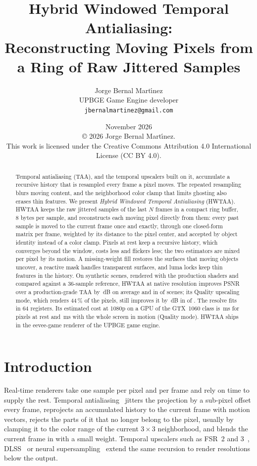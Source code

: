 \documentclass[11pt,a4paper]{article}
\title{Hybrid Windowed Temporal Antialiasing:\\Reconstructing Moving Pixels from a Ring of Raw Jittered Samples}
\author{Jorge Bernal Mart\'{\i}nez\\
  \small UPBGE Game Engine developer\\
  \small\texttt{jbernalmartinez@gmail.com}}
\date{November 2026\\[4pt]\footnotesize \copyright{} 2026 Jorge Bernal Mart\'{\i}nez. \\ This work is licensed under the Creative Commons Attribution 4.0 International License (CC BY 4.0).}
\begin{document}
\maketitle

\begin{abstract}
Temporal antialiasing (TAA), and the temporal upscalers built on it, accumulate a recursive history that is resampled every frame a pixel moves. The repeated resampling blurs moving content, and the neighborhood color clamp that limits ghosting also erases thin features. We present \emph{Hybrid Windowed Temporal Antialiasing} (HWTAA). HWTAA keeps the raw jittered samples of the last $N$ frames in a compact ring buffer, 8 bytes per sample, and reconstructs each moving pixel directly from them: every past sample is moved to the current frame once and exactly, through one closed-form matrix per frame, weighted by its distance to the pixel center, and accepted by object identity instead of a color clamp. Pixels at rest keep a recursive history, which converges beyond the window, costs less and flickers less; the two estimators are mixed per pixel by its motion. A missing-weight fill restores the surfaces that moving objects uncover, a reactive mask handles transparent surfaces, and luma locks keep thin features in the history. On \nNumScenes{} synthetic scenes, rendered with the production shaders and compared against a 36-sample reference, HWTAA at native resolution improves PSNR over a production-grade TAA by \nGainAllNat{}\,dB on average and in \nWinsNat{} of \nNumScenes{} scenes; its Quality upscaling mode, which renders 44\,\% of the pixels, still improves it by \nGainAllQ{}\,dB in \nWinsQ{} of \nNumScenes{}. The resolve fits in 64 registers. Its estimated cost at 1080p on a GPU of the GTX~1060 class is \nMsStillQHd{}\,ms for pixels at rest and \nMsMovingQHd{}\,ms with the whole screen in motion (Quality mode). HWTAA ships in the eevee-game renderer of the UPBGE game engine.
\end{abstract}

\section{Introduction}

Real-time renderers take one sample per pixel and per frame and rely on time to supply the rest. Temporal antialiasing~\cite{karis2014taa,salvi2016taa,yang2020survey} jitters the projection by a sub-pixel offset every frame, reprojects an accumulated history to the current frame with motion vectors, rejects the parts of it that no longer belong to the pixel, usually by clamping it to the color range of the current $3\times3$ neighborhood, and blends the current frame in with a small weight. Temporal upscalers such as FSR~2 and 3~\cite{amd2023fsr2,amd2024fsr3}, DLSS~\cite{liu2020dlss} or neural supersampling~\cite{xiao2020neural} extend the same recursion to render resolutions below the output.
\end{document}
